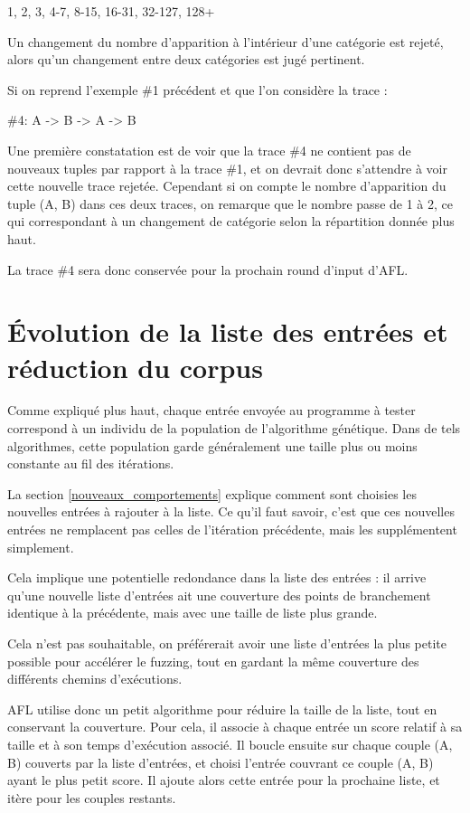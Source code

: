 1, 2, 3, 4-7, 8-15, 16-31, 32-127, 128+

Un changement du nombre d'apparition à l'intérieur d'une catégorie
est rejeté, alors qu'un changement entre deux catégories est jugé
pertinent.

Si on reprend l'exemple \#1 précédent et que l'on considère la trace :

\#4: A -> B -> A -> B

Une première constatation est de voir que la trace \#4 ne contient pas de
nouveaux tuples par rapport à la trace \#1, et on devrait donc s'attendre
à voir cette nouvelle trace rejetée. Cependant si on compte le nombre
d'apparition du tuple (A, B) dans ces deux traces, on remarque que le
nombre passe de 1 à 2, ce qui correspondant à un changement de catégorie
selon la répartition donnée plus haut.

La trace \#4 sera donc conservée pour la prochain round d'input d'AFL.

\section{Évolution de la liste des entrées et réduction du corpus}

Comme expliqué plus haut, chaque entrée envoyée au programme à tester
correspond à un individu de la population de l'algorithme génétique.
Dans de tels algorithmes, cette population garde généralement une taille
plus ou moins constante au fil des itérations.

La section \ref{nouveaux_comportements} explique comment sont choisies les
nouvelles entrées à rajouter à la liste. Ce qu'il faut savoir, c'est que
ces nouvelles entrées ne remplacent pas celles de l'itération précédente,
mais les supplémentent simplement.

Cela implique une potentielle redondance dans la liste des entrées :
il arrive qu'une nouvelle liste d'entrées ait une couverture des points
de branchement identique à la précédente, mais avec une taille de liste
plus grande.

Cela n'est pas souhaitable, on préférerait avoir une liste d'entrées la
plus petite possible pour accélérer le fuzzing, tout en gardant la même
couverture des différents chemins d'exécutions.

AFL utilise donc un petit algorithme pour réduire la taille de la liste,
tout en conservant la couverture. Pour cela, il associe à chaque entrée
un score relatif à sa taille et à son temps d'exécution associé. Il boucle
ensuite sur chaque couple (A, B) couverts par la liste d'entrées, et choisi
l'entrée couvrant ce couple (A, B) ayant le plus petit score. Il ajoute alors
cette entrée pour la prochaine liste, et itère pour les couples restants.

